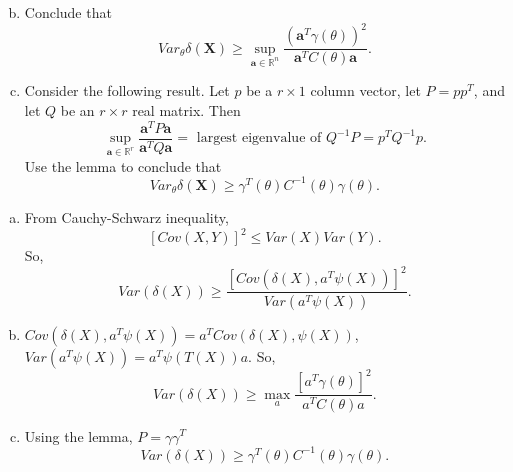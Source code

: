 \begin{ex}
\begin{enumerate}[(a)]
\[            \]
            \item Conclude that
            \[
                Var_{\theta} \delta(\mathbf{X}) \geq \sup _{\mathbf{a} \in \mathbb{R}^{n}} \frac{\left(\mathbf{a}^T \gamma(\theta)\right)^{2}}{\mathbf{a}^T C(\theta) \mathbf{a}}. 
            \]
            \item Consider the following result. 
            Let \(p\) be a \(r \times 1\) column vector, let \(P=p p^T\), and let \(Q\) be an \(r \times r\) real matrix. Then
            \[
            \sup _{\mathbf{a} \in \mathbb{R}^{r}} \frac{\mathbf{a}^T P \mathbf{a}}{\mathbf{a}^T Q \mathbf{a}}=\text { largest eigenvalue of } Q^{-1} P=p^T Q^{-1} p. 
            \]
            Use the lemma to conclude that
            \[
             Var_{\theta} \delta(\mathbf{X}) \geq \gamma^T(\theta) C^{-1}(\theta) \gamma(\theta). 
            \]
        \end{enumerate}
\end{ex}

\begin{solution}
    \begin{enumerate}[(a)]
        \item From Cauchy-Schwarz inequality, 
        \[
            [Cov(X,Y)]^2\leqslant Var(X) Var(Y). 
        \]
        So, \[
            Var(\delta(X))\geqslant \frac{[Cov(\delta(X), a^T\psi(X))]^2}{Var(a^T\psi(X))}. 
        \]
        \item $Cov(\delta(X), a^T\psi(X))=a^TCov(\delta(X), \psi(X))$, $Var(a^T\psi(X))=a^T\psi(T(X))a$. So, 
        \[
            Var(\delta(X))\geqslant \max_a\frac{[a^T\gamma(\theta)]^2}{a^TC(\theta)a}. 
        \]
        \item Using the lemma, $P=\gamma\gamma^T$
        \[
            Var(\delta(X))\geqslant \gamma^T(\theta)C^{-1}(\theta) \gamma(\theta). 
        \]
    \end{enumerate}
\end{solution}

